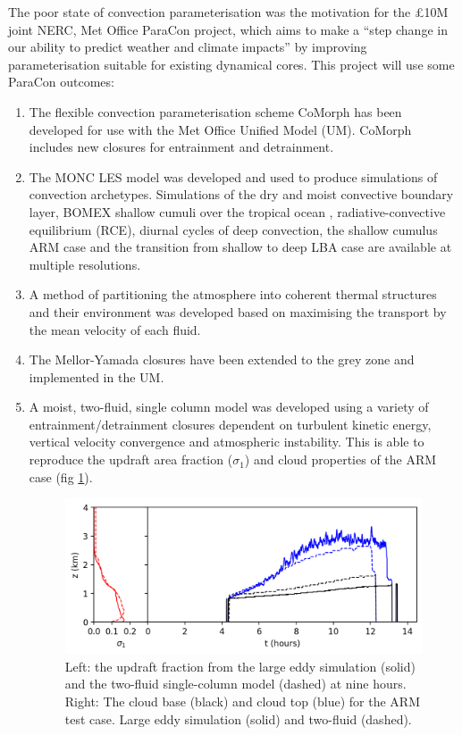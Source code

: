 \documentclass[11pt,a4paper]{article}
\begin{document}
The poor state of convection parameterisation was the motivation for the \pounds 10M joint NERC, Met Office ParaCon project, which aims to make a ``step change in our ability to predict weather and climate impacts'' by improving parameterisation suitable for existing dynamical cores. This project will use some ParaCon outcomes:
\begin{enumerate}
\item The flexible convection parameterisation scheme CoMorph has been developed for use with the Met Office Unified Model (UM). CoMorph includes new closures for entrainment and detrainment.

\item The MONC LES model was developed and used to produce simulations of convection archetypes. Simulations of the dry and moist convective boundary layer, BOMEX shallow cumuli over the tropical ocean \cite[]{HR73}, radiative-convective equilibrium (RCE), diurnal cycles of deep convection, the shallow cumulus ARM case \cite[]{BCC+02} and the transition from shallow to deep LBA case \cite[]{BFGB02} are available at multiple resolutions.

\item A method of partitioning the atmosphere into coherent thermal structures and their environment was developed \cite[]{ETB20} based on maximising the transport by the mean velocity of each fluid.

\item The Mellor-Yamada closures have been extended to the grey zone and implemented in the UM.

\item A moist, two-fluid, single column model was developed using a variety of entrainment/detrainment closures dependent on turbulent kinetic energy, vertical velocity convergence and atmospheric instability. This is able to reproduce the updraft area fraction ($\sigma_1$) and cloud properties of the ARM case \cite[]{BCC+02} (fig \ref{fig:clouds}). 

\begin{figure}
\includegraphics[width=\linewidth]{exeterScm.png}
\caption{Left: the updraft fraction from the large eddy simulation (solid) and the two-fluid single-column model (dashed) at nine hours. Right: The cloud base (black) and cloud top (blue) for the ARM test case. Large eddy simulation (solid) and two-fluid (dashed).}
\label{fig:clouds}
\end{figure}


\end{enumerate}
\end{document}
